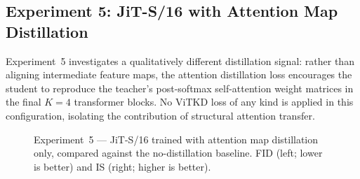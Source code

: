 \subsection{Experiment 5: JiT-S/16 with Attention Map Distillation}
\label{subsec:exp5}

Experiment~5 investigates a qualitatively different distillation signal:
rather than aligning intermediate feature maps, the attention distillation
loss encourages the student to reproduce the teacher's post-softmax
self-attention weight matrices in the final $K = 4$ transformer blocks.
No ViTKD loss of any kind is applied in this configuration, isolating the
contribution of structural attention transfer.

\begin{figure}[ht]
    \centering
    \begin{subfigure}[b]{0.44\linewidth}
        \centering
    \end{subfigure}
    \hfill
    \begin{subfigure}[b]{0.44\linewidth}
        \centering
    \end{subfigure}
    \caption{Experiment~5 — JiT-S/16 trained with attention map
    distillation only, compared against the no-distillation baseline.
    FID (left; lower is better) and IS (right; higher is better).}
    \label{fig:exp5_results}
\end{figure}

